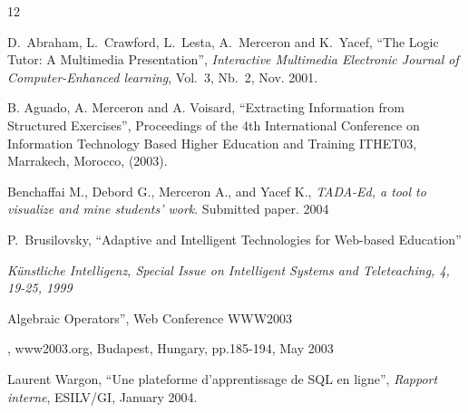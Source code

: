 \documentclass[10pt,twocolumn]{IEEEtran}
\begin{document}
\begin{thebibliography}{12}


D.~Abraham, L.~Crawford, L.~Lesta, A.~Merceron  and K.~Yacef,
``The Logic Tutor: A Multimedia Presentation'', {\em Interactive
Multimedia Electronic Journal of Computer-Enhanced learning}, Vol.~3,
Nb.~2, Nov. 2001.



 B. Aguado, A. Merceron and A. Voisard, ``Extracting
Information from Structured Exercises'',  Proceedings of  the 4th
International Conference on Information Technology Based Higher
Education and Training ITHET03, Marrakech, Morocco, (2003).

Benchaffai M., Debord G., Merceron A., and Yacef K., {\it TADA-Ed, a tool to visualize and mine students' work}. Submitted paper. 2004


 P.~Brusilovsky, ``Adaptive and Intelligent
Technologies for Web-based Education'' {\em K\"unstliche Intelligenz,
Special Issue on Intelligent Systems and Teleteaching,  4, 19-25, 1999

Algebraic Operators'',
Web Conference WWW2003}, www2003.org, Budapest, Hungary, pp.185-194, May
2003



Laurent Wargon, ``Une plateforme d'apprentissage de SQL en ligne'', {\em Rapport interne},
ESILV/GI, January 2004.


\end{thebibliography}
\end{document}
